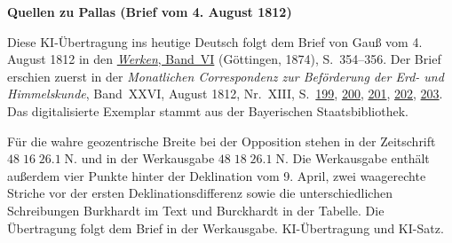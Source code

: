 \clearpage\thispagestyle{empty}
\begin{center}\textbf{Quellen zu Pallas (Brief vom 4. August 1812)}\end{center}
\noindent Diese KI-Übertragung ins heutige Deutsch folgt dem Brief von Gauß vom 4. August 1812 in den \href{https://gdz.sub.uni-goettingen.de/id/PPN236007467}{\textit{Werken}, Band~VI} (Göttingen, 1874), S.~354--356. Der Brief erschien zuerst in der \textit{Monatlichen Correspondenz zur Beförderung der Erd- und Himmelskunde}, Band~XXVI, August 1812, Nr.~XIII, S.~\href{https://api.digitale-sammlungen.de/iiif/image/v2/bsb10538615_00207/full/1600,/0/default.jpg}{199}, \href{https://api.digitale-sammlungen.de/iiif/image/v2/bsb10538615_00208/full/1600,/0/default.jpg}{200}, \href{https://api.digitale-sammlungen.de/iiif/image/v2/bsb10538615_00209/full/1600,/0/default.jpg}{201}, \href{https://api.digitale-sammlungen.de/iiif/image/v2/bsb10538615_00210/full/1600,/0/default.jpg}{202}, \href{https://api.digitale-sammlungen.de/iiif/image/v2/bsb10538615_00211/full/1600,/0/default.jpg}{203}. Das digitalisierte Exemplar stammt aus der Bayerischen Staatsbibliothek.
\par\smallskip\noindent Für die wahre geozentrische Breite bei der Opposition stehen in der Zeitschrift $48\;16\;26.1\;\mathrm{N}.$ und in der Werkausgabe $48\;18\;26.1\;\mathrm{N}.$ Die Werkausgabe enthält außerdem vier Punkte hinter der Deklination vom 9. April, zwei waagerechte Striche vor der ersten Deklinationsdifferenz sowie die unterschiedlichen Schreibungen Burkhardt im Text und Burckhardt in der Tabelle. Die Übertragung folgt dem Brief in der Werkausgabe. KI-Übertragung und KI-Satz.
\clearpage
